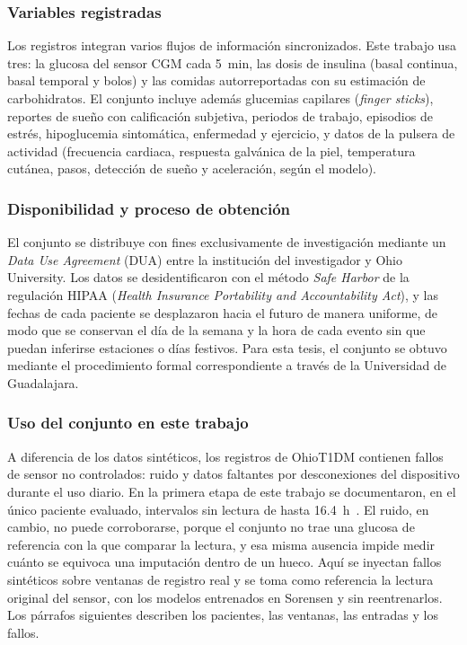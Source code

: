 \documentclass{report}
\begin{document}
\subsubsection*{Variables registradas}

Los registros integran varios flujos de información sincronizados. Este trabajo usa tres: la glucosa del sensor CGM cada 5~min, las dosis de insulina (basal continua, basal temporal y bolos) y las comidas autorreportadas con su estimación de carbohidratos. El conjunto incluye además glucemias capilares (\textit{finger sticks}), reportes de sueño con calificación subjetiva, periodos de trabajo, episodios de estrés, hipoglucemia sintomática, enfermedad y ejercicio, y datos de la pulsera de actividad (frecuencia cardiaca, respuesta galvánica de la piel, temperatura cutánea, pasos, detección de sueño y aceleración, según el modelo).

\subsubsection*{Disponibilidad y proceso de obtención}

El conjunto se distribuye con fines exclusivamente de investigación mediante un \textit{Data Use Agreement} (DUA) entre la institución del investigador y Ohio University. Los datos se desidentificaron con el método \textit{Safe Harbor} de la regulación HIPAA (\textit{Health Insurance Portability and Accountability Act}), y las fechas de cada paciente se desplazaron hacia el futuro de manera uniforme, de modo que se conservan el día de la semana y la hora de cada evento sin que puedan inferirse estaciones o días festivos. Para esta tesis, el conjunto se obtuvo mediante el procedimiento formal correspondiente a través de la Universidad de Guadalajara.

\subsubsection*{Uso del conjunto en este trabajo}
 
A diferencia de los datos sintéticos, los registros de OhioT1DM contienen fallos de sensor no controlados: ruido y datos faltantes por desconexiones del dispositivo durante el uso diario. En la primera etapa de este trabajo se documentaron, en el único paciente evaluado, intervalos sin lectura de hasta 16.4~h~\cite{sanchez2025imputation}. El ruido, en cambio, no puede corroborarse, porque el conjunto no trae una glucosa de referencia con la que comparar la lectura, y esa misma ausencia impide medir cuánto se equivoca una imputación dentro de un hueco. Aquí se inyectan fallos sintéticos sobre ventanas de registro real y se toma como referencia la lectura original del sensor, con los modelos entrenados en Sorensen y sin reentrenarlos. Los párrafos siguientes describen los pacientes, las ventanas, las entradas y los fallos.
 
\end{document}
